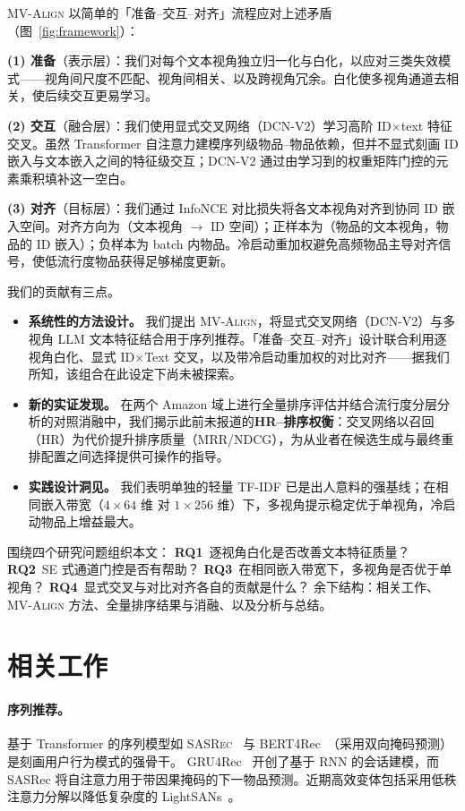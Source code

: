 \documentclass[sigconf,natbib=true,anonymous]{acmart}
\newcommand{\model}{\textsc{MV-Align}\xspace}
\newcommand{\base}{\textsc{SASRec}\xspace}
\newcommand{\tfidf}{\textsc{TF-IDF}\xspace}
\newcommand{\llm}{\textsc{LLM}\xspace}
\begin{document}
\model 以简单的「准备--交互--对齐」流程应对上述矛盾（图~\ref{fig:framework}）：

\textbf{(1) 准备}（表示层）：我们对每个文本视角独立归一化与白化，以应对三类失效模式——视角间尺度不匹配、视角间相关、以及跨视角冗余。白化使多视角通道去相关，使后续交互更易学习。

\textbf{(2) 交互}（融合层）：我们使用显式交叉网络（DCN-V2）学习高阶 ID$\times$text 特征交叉。虽然 Transformer 自注意力建模序列级物品--物品依赖，但并不显式刻画 ID 嵌入与文本嵌入之间的特征级交互；DCN-V2 通过由学习到的权重矩阵门控的元素乘积填补这一空白。

\textbf{(3) 对齐}（目标层）：我们通过 InfoNCE 对比损失将各文本视角对齐到协同 ID 嵌入空间。对齐方向为（文本视角 $\to$ ID 空间）；正样本为（物品的文本视角，物品的 ID 嵌入）；负样本为 batch 内物品。冷启动重加权避免高频物品主导对齐信号，使低流行度物品获得足够梯度更新。

我们的贡献有三点。
\begin{itemize}[leftmargin=*,itemsep=1pt]
  \item \textbf{系统性的方法设计。} 我们提出 \model，将显式交叉网络（DCN-V2）与多视角 \llm 文本特征结合用于序列推荐。「准备--交互--对齐」设计联合利用逐视角白化、显式 ID$\times$Text 交叉，以及带冷启动重加权的对比对齐——据我们所知，该组合在此设定下尚未被探索。
  \item \textbf{新的实证发现。} 在两个 Amazon 域上进行全量排序评估并结合流行度分层分析的对照消融中，我们揭示此前未报道的\textbf{HR--排序权衡}：交叉网络以召回（HR）为代价提升排序质量（MRR/NDCG），为从业者在候选生成与最终重排配置之间选择提供可操作的指导。
  \item \textbf{实践设计洞见。} 我们表明单独的轻量 \tfidf 已是出人意料的强基线；在相同嵌入带宽（$4{\times}64$ 维 对 $1{\times}256$ 维）下，多视角提示稳定优于单视角，冷启动物品上增益最大。
\end{itemize}
围绕四个研究问题组织本文：
\textbf{RQ1}~逐视角白化是否改善文本特征质量？
\textbf{RQ2}~SE 式通道门控是否有帮助？
\textbf{RQ3}~在相同嵌入带宽下，多视角是否优于单视角？
\textbf{RQ4}~显式交叉与对比对齐各自的贡献是什么？
余下结构：相关工作、\model 方法、全量排序结果与消融、以及分析与总结。

\section{相关工作}
\paragraph{序列推荐。}
基于 Transformer 的序列模型如 \base~\cite{kang2018sasrec} 与 BERT4Rec~\cite{sun2019bert4rec}（采用双向掩码预测）是刻画用户行为模式的强骨干。
GRU4Rec~\cite{hidasi2016gru4rec} 开创了基于 RNN 的会话建模，而 SASRec 将自注意力用于带因果掩码的下一物品预测。近期高效变体包括采用低秩注意力分解以降低复杂度的 LightSANs~\cite{fan2021lightsans}。
\end{document}
